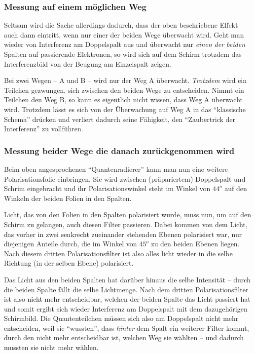 	\subsubsection{Messung auf einem möglichen Weg}

Seltsam wird die Sache allerdings dadurch, dass der oben beschriebene Effekt auch dann eintritt, wenn nur einer der beiden Wege überwacht wird. Geht man wieder von Interferenz am Doppelspalt aus und überwacht nur \emph{einen der beiden} Spalten auf passierende Elektronen, so wird sich auf dem Schirm trotzdem das Interferenzbild von der Beugung am Einzelspalt zeigen.

Bei zwei Wegen -- A und B -- wird nur der Weg A überwacht. \emph{Trotzdem} wird ein Teilchen gezwungen, sich zwischen den beiden Wege zu entscheiden. Nimmt ein Teilchen den Weg B, so kann es eigentlich nicht wissen, dass Weg A überwacht wird. Trotzdem lässt es sich von der Überwachung auf Weg A in das "`klassische Schema"' drücken und verliert dadurch seine Fähigkeit, den "`Zaubertrick der Interferenz"' zu vollführen.






	\subsubsection{Messung beider Wege die danach zurückgenommen wird}

Beim oben angesprochenen "`Quantenradierer"' kann man nun eine weitere Polarisationsfolie einbringen. Sie wird zwischen (präpariertem) Doppelspalt und Schrim eingebracht und ihr Polarisationswinkel steht im Winkel von $44^o$ auf den Winkeln der beiden Folien in den Spalten.

Licht, das von den Folien in den Spalten polarisiert wurde, muss nun, um auf den Schirm zu gelangen, auch diesen Filter passieren. Dabei kommen von dem Licht, das vorher in zwei senkrecht zueinander stehenden Ebenen polarisiert war, nur diejenigen Anteile durch, die im Winkel von $45^o$ zu den beiden Ebenen liegen. Nach diesem dritten Polarisationsfilter ist also alles licht wieder in die selbe Richtung (in der selben Ebene) polarisiert.

Das Licht aus den beiden Spalten hat darüber hinaus die selbe Intensität -- durch die beiden Spalte fällt die selbe Lichtmenge. Nach dem dritten Polarisationsfilter ist also nicht mehr entscheidbar, welchen der beiden Spalte das Licht passiert hat und somit ergibt sich wieder Interferenz am Doppelspalt mit dem dazugehörigen Schirmbild. Die Quantenteilchen müssen sich also am Doppelspalt nicht mehr entscheiden, weil sie "`wussten"', dass \emph{hinter} dem Spalt ein weiterer Filter kommt, durch den nicht mehr entscheidbar ist, welchen Weg sie wählten -- und dadurch mussten sie nicht mehr wählen. 


